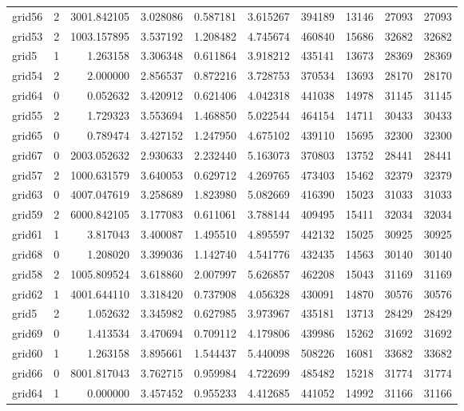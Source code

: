\documentclass[../../../thesis.tex]{subfiles}
\begin{document}
\begin{longtable}{|l|r|r|r|r|r|r|r|r|r|}
grid56 & 2 & 3001.842105 & 3.028086 & 0.587181 & 3.615267 & 394189 & 13146 & 27093 & 27093 \\
grid53 & 2 & 1003.157895 & 3.537192 & 1.208482 & 4.745674 & 460840 & 15686 & 32682 & 32682 \\
grid5 & 1 & 1.263158 & 3.306348 & 0.611864 & 3.918212 & 435141 & 13673 & 28369 & 28369 \\
grid54 & 2 & 2.000000 & 2.856537 & 0.872216 & 3.728753 & 370534 & 13693 & 28170 & 28170 \\
grid64 & 0 & 0.052632 & 3.420912 & 0.621406 & 4.042318 & 441038 & 14978 & 31145 & 31145 \\
grid55 & 2 & 1.729323 & 3.553694 & 1.468850 & 5.022544 & 464154 & 14711 & 30433 & 30433 \\
grid65 & 0 & 0.789474 & 3.427152 & 1.247950 & 4.675102 & 439110 & 15695 & 32300 & 32300 \\
grid67 & 0 & 2003.052632 & 2.930633 & 2.232440 & 5.163073 & 370803 & 13752 & 28441 & 28441 \\
grid57 & 2 & 1000.631579 & 3.640053 & 0.629712 & 4.269765 & 473403 & 15462 & 32379 & 32379 \\
grid63 & 0 & 4007.047619 & 3.258689 & 1.823980 & 5.082669 & 416390 & 15023 & 31033 & 31033 \\
grid59 & 2 & 6000.842105 & 3.177083 & 0.611061 & 3.788144 & 409495 & 15411 & 32034 & 32034 \\
grid61 & 1 & 3.817043 & 3.400087 & 1.495510 & 4.895597 & 442132 & 15025 & 30925 & 30925 \\
grid68 & 0 & 1.208020 & 3.399036 & 1.142740 & 4.541776 & 432435 & 14563 & 30140 & 30140 \\
grid58 & 2 & 1005.809524 & 3.618860 & 2.007997 & 5.626857 & 462208 & 15043 & 31169 & 31169 \\
grid62 & 1 & 4001.644110 & 3.318420 & 0.737908 & 4.056328 & 430091 & 14870 & 30576 & 30576 \\
grid5 & 2 & 1.052632 & 3.345982 & 0.627985 & 3.973967 & 435181 & 13713 & 28429 & 28429 \\
grid69 & 0 & 1.413534 & 3.470694 & 0.709112 & 4.179806 & 439986 & 15262 & 31692 & 31692 \\
grid60 & 1 & 1.263158 & 3.895661 & 1.544437 & 5.440098 & 508226 & 16081 & 33682 & 33682 \\
grid66 & 0 & 8001.817043 & 3.762715 & 0.959984 & 4.722699 & 485482 & 15218 & 31774 & 31774 \\
grid64 & 1 & 0.000000 & 3.457452 & 0.955233 & 4.412685 & 441052 & 14992 & 31166 & 31166 \\

\end{longtable}
\end{document}
